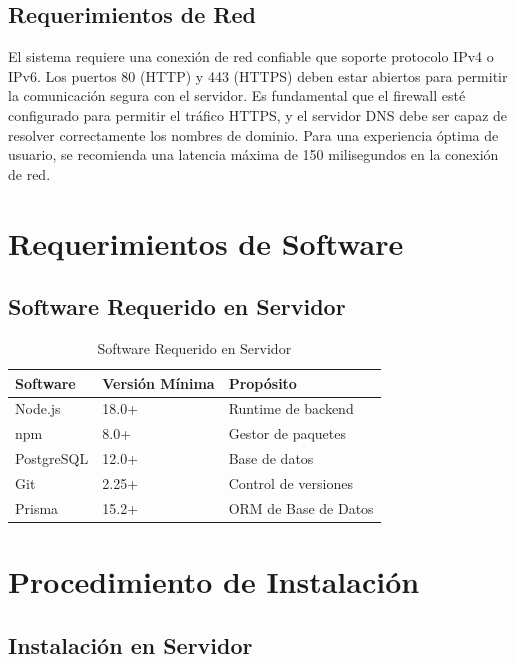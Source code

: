\documentclass[12pt,a4paper,spanish,oneside]{article}
\begin{document}
	\subsection{Requerimientos de Red}
	
	El sistema requiere una conexión de red confiable que soporte protocolo IPv4 o IPv6. Los puertos 80 (HTTP) y 443 (HTTPS) deben estar abiertos para permitir la comunicación segura con el servidor. Es fundamental que el firewall esté configurado para permitir el tráfico HTTPS, y el servidor DNS debe ser capaz de resolver correctamente los nombres de dominio. Para una experiencia óptima de usuario, se recomienda una latencia máxima de 150 milisegundos en la conexión de red.
	
	
	\section{Requerimientos de Software}
	
	\subsection{Software Requerido en Servidor}
	
	\begin{table}[H]
		\centering
		\caption{Software Requerido en Servidor}
		\begin{tabular}{|l|l|l|}
			\hline
			\textbf{Software} & \textbf{Versión Mínima} & \textbf{Propósito} \\
			\hline
			Node.js & 18.0+ & Runtime de backend \\
			\hline
			npm & 8.0+ & Gestor de paquetes \\
			\hline
			PostgreSQL & 12.0+ & Base de datos \\
			\hline
			Git & 2.25+ & Control de versiones \\
			\hline
			Prisma & 15.2+ & ORM de Base de Datos \\
			\hline
		\end{tabular}
	\end{table}
	
	\section{Procedimiento de Instalación}
	
	\subsection{Instalación en Servidor}
	
\end{document}
